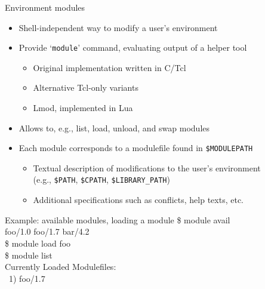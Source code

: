 \documentclass[10pt,xcolor={usenames,dvipsnames}]{beamer}
\begin{document}
\begin{frame}{Environment modules}
\begin{itemize}
    \item
        Shell-independent way to modify a user's environment
    \item
        Provide `\texttt{module}' command, evaluating output of a helper tool
        \begin{itemize}
            \item
                Original implementation written in C/Tcl
            \item
                Alternative Tcl-only variants
            \item
                Lmod, implemented in Lua
        \end{itemize}
    \item
        Allows to, e.g., list, load, unload, and swap modules
    \item
        Each module corresponds to a modulefile found in \texttt{\$MODULEPATH}
        \begin{itemize}
            \item
                Textual description of modifications to the user's environment\\
                (e.g., \texttt{\$PATH}, \texttt{\$CPATH},
                \texttt{\$LIBRARY\_PATH})
            \item
                Additional specifications such as conflicts, help texts, etc.
        \end{itemize}
\end{itemize}
\vspace*{-10pt}
\begin{center}
    \begin{minipage}{0.9\textwidth}
        \begin{exampleblock}{Example: available modules, loading a module}
            \ttfamily
            \$ module avail\\
            foo/1.0 \quad foo/1.7 \quad bar/4.2\\
            \$ module load foo\\
            \$ module list\\
            Currently Loaded Modulefiles:\\
            ~1) foo/1.7
        \end{exampleblock}
    \end{minipage}
\end{center}
\end{frame}
\end{document}
